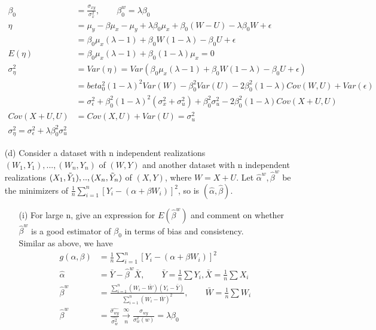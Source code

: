 \documentclass{homework}
\begin{document}
\begin{itemize}
\begin{align*}
    \beta_0 &= \frac{\sigma_{xy}}{\sigma_x^2}, \qquad \beta_0^{w} = \lambda \beta_0\\
    \eta &=  \mu_y - \beta \mu_x -  \mu_y + \lambda \beta_0\mu_x + \beta_0 (W-U) -\lambda \beta_0 W + \epsilon\\
    &= \beta_0\mu_x(\lambda - 1) + \beta_0W (1-\lambda) -\beta_0 U + \epsilon\\
    E(\eta) &= \beta_0\mu_x(\lambda - 1)+ \beta_0 (1-\lambda) \mu_x =0\\
    \sigma_\eta^2 &= Var(\eta) = Var(\beta_0\mu_x(\lambda - 1) + \beta_0 W (1-\lambda) -\beta_0 U + \epsilon)\\
    &= beta_0^2(1-\lambda)^2Var(W) - \beta_0^2 Var(U) -2 \beta_0^2 (1-\lambda) Cov(W,U) + Var(\epsilon)\\
    &= \sigma_\epsilon^2 + \beta_0^2(1-\lambda)^2 (\sigma_x^2 + \sigma_u^2) + \beta_0^2\sigma_u^2 - 2\beta_0^2(1-\lambda) Cov(X+U, U)\\
    Cov(X+U, U) &= Cov(X,U) + Var(U) = \sigma_u^2\\
    \sigma_\eta^2 = \sigma_\epsilon^2 + \lambda\beta_0^2\sigma_u^2
    \end{align*}     
    \item[(d)] Consider a dataset with n independent realizations $(W_1, Y_1), ..., (W_n,Y_n)$ of $(W,Y)$ and another dataset with n independent realizations $(X_1, \Tilde{Y}_1),.. , (X_n, \Tilde{Y}_n)$ of $(X,Y)$, where $W= X+U$. Let $\hat{\alpha}^w, \hat{\beta}^w$ be the minimizers of $\frac{1}{n} \sum_{i=1}^{n} [Y_i - (\alpha+ \beta W_i)]^2$, so is $(\hat{\alpha}, \hat{\beta})$. \\
    \begin{itemize}
        \item [(i)] For large n, give an expression for $E(\hat{\beta}^w)$ and comment on whether $\hat{\beta}^w$ is a good estimator of $\beta_0$ in terms of bias and consistency.\\
        Similar as above, we have 
     \begin{align*}
    g(\alpha, \beta) &=\frac{1}{n} \sum_{i=1}^{n} [Y_i - (\alpha+ \beta W_i)]^2\\
    \hat{\alpha} &= \bar{Y} - \hat{\beta}^w \bar{X}, \qquad \bar{Y} = \frac{1}{n}\sum Y_i,\bar{X} = \frac{1}{n}\sum X_i \\
    \hat{\beta}^w &= \frac{\sum_{i=1}^n (W_i - \bar{W})(Y_i - \bar{Y})}{\sum_{i=1}^n (W_i-\bar{W})^2}, \qquad \bar{W} = \frac{1}{n} \sum W_i \\
    \hat{\beta}^w &= \frac{\hat{\sigma_{wy}}}{\hat{\sigma_w^2}} \xrightarrow[n]{ \infty} \frac{\sigma_{wy}}{\sigma_w^2(w)} = \lambda \beta_0\\

\end{align*}
\end{itemize}
\end{itemize}
\end{document}
